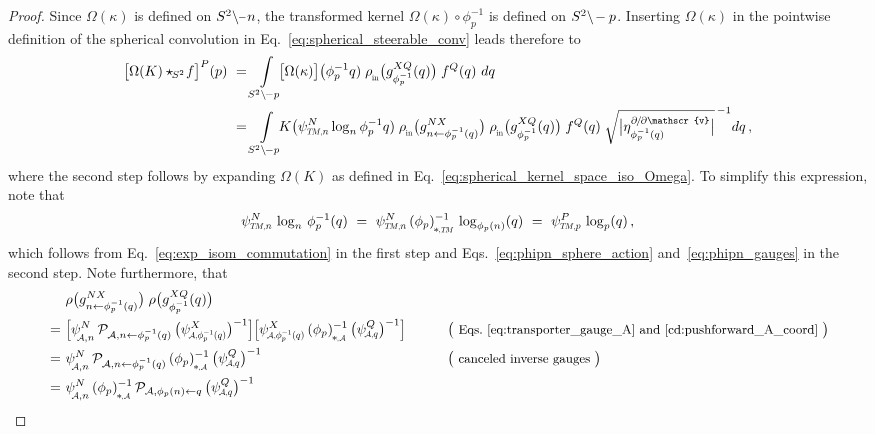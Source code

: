 \begin{proof}
    Since $\Omega(\kappa)$ is defined on $S^2 \backslash \mkern-1mu\minus\mkern1mu n$, the transformed kernel $\Omega(\kappa) \circ \phi_p^{-1}$ is defined on $S^2 \backslash \mkern-2mu -p$.
    Inserting $\Omega(\kappa)$ in the pointwise definition of the spherical convolution in Eq.~\eqref{eq:spherical_steerable_conv} leads therefore to
    \begin{align}
        \big[\Omega(K) \star_{\mkern-2mu S^2}\! f\big]^P(p)
        \ &= \int\limits_{S^2 \backslash \mkern-2mu -p} \mkern-8mu \big[\Omega(\kappa)\big] \big(\phi_p^{-1}q)\; \rhoin\big( g_{\phi_p^{-1}}^{XQ}(q) \big)\; f^Q(q)\ dq \\
        \ &= \int\limits_{S^2 \backslash \mkern-2mu -p} \mkern-8mu K\big( \psiTMn^N \log_n \phi_p^{-1}q)\; \rhoin\big( g_{n\leftarrow \phi_p^{-1}(q)}^{NX} \big) \; \rhoin\big( g_{\phi_p^{-1}}^{XQ}(q) \big)\; f^Q(q)\; \sqrt{\big|\eta_{\phi_p^{-1}(q)}^{\partial\mkern-2mu/\mkern-2mu\partial\mathscr{v}}\big|}^{\,-1} dq \,, \notag
    \end{align}
    where the second step follows by expanding $\Omega(K)$ as defined in Eq.~\eqref{eq:spherical_kernel_space_iso_Omega}.
    To simplify this expression, note that 
    \begin{align}
        \psiTMn^N\, \log_n\, \phi_p^{-1} (q)
        \ =\ \psiTMn^N\, \dphipTM^{-1}\, \log_{\phi_p(n)} (q)
        \ =\ \psiTMp^P\, \log_p (q) \,,
    \end{align}
    which follows from Eq.~\eqref{eq:exp_isom_commutation} in the first step and Eqs.~\eqref{eq:phipn_sphere_action} and~\eqref{eq:phipn_gauges} in the second step.
    Note furthermore, that
    \begin{alignat}{3}
        \qquad
           &\ \rho\big( g_{n\leftarrow \phi_p^{-1}(q)}^{NX} \big) \; \rho\big( g_{\phi_p^{-1}}^{XQ}(q) \big) \notag \\
        \ =&\ \pig[ \psiAn^N\, \mathcal{P}_{\A, n\leftarrow \phi_p^{-1}(q)}\, \big(\psiAphipinvq^X\big)^{-1} \pig]
              \pig[ \psiAphipinvq^X\, \dphipA^{-1}\, \big(\psiAq^Q\big)^{-1} \pig]
            \qquad && \big( \text{\small Eqs.~\eqref{eq:transporter_gauge_A} and~\eqref{cd:pushforward_A_coord} } \big) \notag\\
        \ =&\ \psiAn^N\, \mathcal{P}_{\A, n\leftarrow \phi_p^{-1}(q)}\, \dphipA^{-1}\, \big(\psiAq^Q\big)^{-1}
            \qquad && \big( \text{\small canceled inverse gauges } \big) \notag\\
        \ =&\ \psiAn^N\, \dphipA^{-1}\, \mathcal{P}_{\A, \phi_p(n)\leftarrow q}\, \big(\psiAq^Q\big)^{-1}

\end{alignat}
\end{proof}
